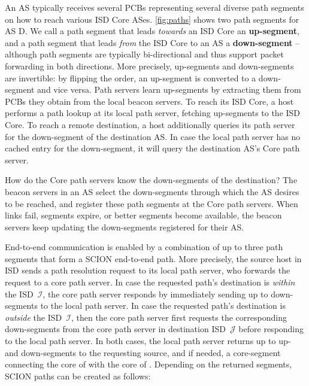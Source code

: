 \documentclass[a4paper]{llncs}
\newcommand\SCION{{\small\textsf{SCION}}\xspace}
\newcommand\D{\textsf{D}\xspace}
\newcommand\cI{\ensuremath{\mathcal{I}}\xspace}
\newcommand\cJ{\ensuremath{\mathcal{J}}\xspace}
\begin{document}
\smallskip
An AS typically receives several PCBs representing several diverse
path segments on how to reach various ISD Core ASes.
\autoref{fig:paths} shows two path segments for AS \D. We call a
path segment that leads \emph{towards} an ISD Core an \textbf{up-segment}, and a path segment that
leads \emph{from} the ISD Core to an AS a \textbf{down-segment} -- although path segments
are typically bi-directional and thus support packet forwarding in both
directions.  More precisely, up-segments and down-segments are invertible: by
flipping the order, an up-segment is converted to a down-segment and vice versa. Path
servers learn up-segments by extracting them from PCBs they obtain from the local
beacon servers. To reach its ISD Core, a host performs a path lookup at its
local path server, fetching up-segments to the ISD Core. To reach a remote
destination, a host additionally queries its path server for the
down-segment of the destination AS. In case the local path server has
no cached entry for the down-segment, it will query the destination
AS's Core path server.

How do the Core path servers know the down-segments of the destination?
The beacon servers in an AS select the down-segments through
which the AS desires to be reached, and register these path segments at the
Core path servers. When links fail, segments expire, or better segments
become available, the beacon servers keep updating the down-segments
registered for their AS.






End-to-end communication is enabled by a combination of up to three
path segments that form a \SCION end-to-end path. More precisely, the
source host in ISD  sends a path resolution request to its local
path server, who forwards the request to a core path server. In case
the requested path's destination is \emph{within} the ISD~\cI, the
core path server responds by immediately sending up to 
down-segments to the local path server. In case the requested path's
destination is \emph{outside} the ISD~\cI, then the core path server
first requests the corresponding down-segments from the core path
server in destination ISD~\cJ before responding to the local path
server. In both cases, the local path server returns up to  up-
and down-segments to the requesting source, and if needed, a
core-segment connecting the core of  with the core of . Depending on the returned
segments, \SCION paths can be created as follows:
\end{document}
